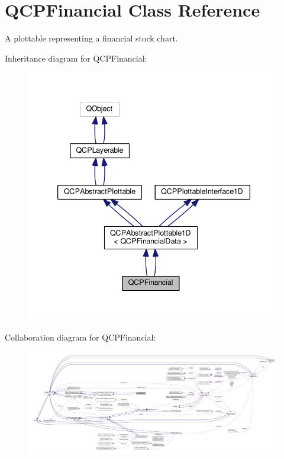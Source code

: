 \hypertarget{class_q_c_p_financial}{}\section{Q\+C\+P\+Financial Class Reference}
\label{class_q_c_p_financial}


A plottable representing a financial stock chart.  




Inheritance diagram for Q\+C\+P\+Financial\+:\nopagebreak
\begin{figure}[H]
\begin{center}
\leavevmode
\includegraphics[width=339pt]{class_q_c_p_financial__inherit__graph}
\end{center}
\end{figure}


Collaboration diagram for Q\+C\+P\+Financial\+:\nopagebreak
\begin{figure}[H]
\begin{center}
\leavevmode
\includegraphics[width=350pt]{class_q_c_p_financial__coll__graph}
\end{center}
\end{figure}
